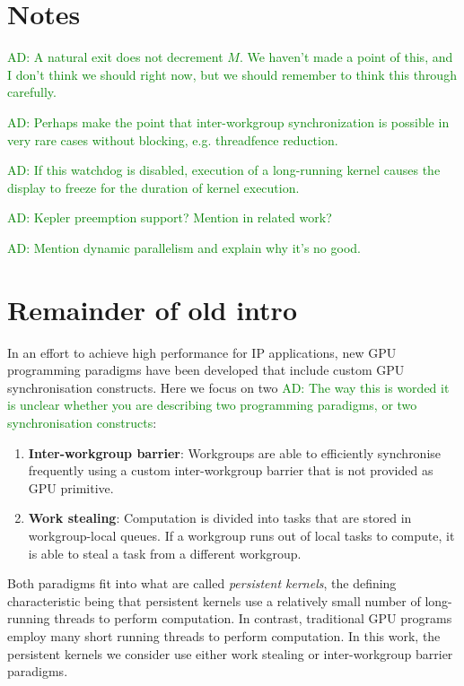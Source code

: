 \documentclass[nocopyrightspace,10pt]{sigplanconf}
\newcommand{\ADComment}[1]{\textcolor{green}{AD: #1}}
\begin{document}
\section{Notes}

\ADComment{A natural exit does not decrement $M$.  We haven't made a point of this, and I don't think we should right now, but we should remember to think this through carefully.}


  \ADComment{Perhaps
  make the point that inter-workgroup synchronization is possible in
  very rare cases without blocking, e.g. threadfence reduction.}

\ADComment{If this watchdog is disabled,
execution of a long-running kernel causes the display to freeze for
the duration of kernel execution.}

\ADComment{Kepler preemption support?  Mention in related work?}

\ADComment{Mention dynamic parallelism and explain why it's no good.}

\section{Remainder of old intro}

In an effort to achieve high performance for IP applications, new GPU
programming paradigms have been developed that include custom GPU
synchronisation constructs. Here we focus on two \ADComment{The way this is worded it is unclear whether you are describing two programming paradigms, or two synchronisation constructs}:

\begin{enumerate}
\item {\bf Inter-workgroup barrier}: Workgroups are able to
  efficiently synchronise frequently using a custom inter-workgroup
  barrier that is not provided as GPU primitive.

\item {\bf Work stealing}: Computation is divided into tasks that are
  stored in workgroup-local queues. If a workgroup runs out of local
  tasks to compute, it is able to steal a task from a different
  workgroup.
\end{enumerate}

Both paradigms fit into what are called \emph{persistent kernels}, the
defining characteristic being that persistent kernels use a relatively
small number of long-running threads to perform computation. In
contrast, traditional GPU programs employ many short running threads
to perform computation. In this work, the persistent kernels we consider
use either work stealing or inter-workgroup barrier paradigms.
\end{document}
